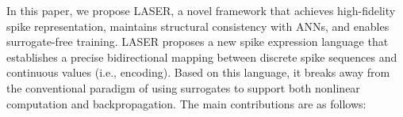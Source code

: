 \documentclass{article}
\theoremstyle{plain}
\theoremstyle{definition}
\theoremstyle{remark}
\begin{document}
In this paper, we propose LASER, a novel framework that achieves high-fidelity spike representation, maintains structural consistency with ANNs, and enables surrogate-free training. 
LASER proposes a new spike expression language that establishes a precise bidirectional mapping between discrete spike sequences and continuous values (i.e., encoding). Based on this language, it breaks away from the conventional paradigm of using surrogates to support both nonlinear computation and backpropagation.
The main contributions are as follows:
\end{document}
